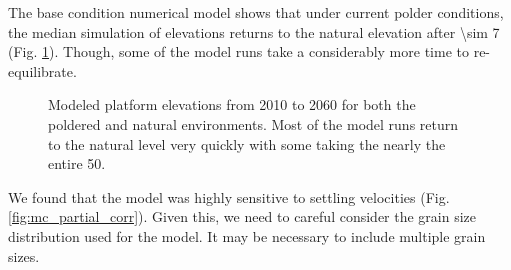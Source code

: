 \documentclass{wscpaperproc}
\theoremstyle{wsc}
\begin{document}
The base condition numerical model shows that under current polder conditions, the median simulation of elevations returns to the natural elevation after \SI{\sim 7}{\year} (Fig. \ref{fig:monte_carlo}). Though, some of the model runs take a considerably more time to re-equilibrate.

\begin{figure}
	\caption[Modeled platform elevations from 2010 to 2060]{\label{fig:monte_carlo} Modeled platform elevations from 2010 to 2060 for both the poldered and natural environments. Most of the model runs return to the natural level very quickly with some taking the nearly the entire \SI{50}{\year}.}
\end{figure}

We found that the model was highly sensitive to settling velocities (Fig. \ref{fig:mc_partial_corr}). Given this, we need to careful consider the grain size distribution used for the model. It may be necessary to include multiple grain sizes.
\end{document}
